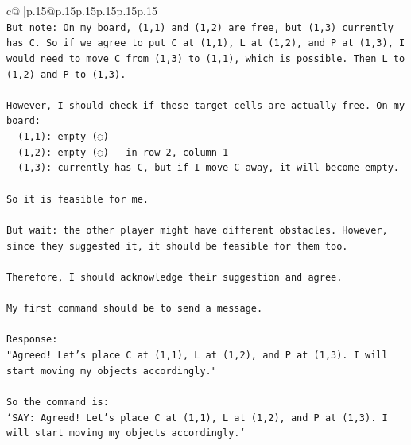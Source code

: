 \documentclass{article}
\begin{document}
{\begin{supertabular}{c@{$\;$}|p{.15\linewidth}@{}p{.15\linewidth}p{.15\linewidth}p{.15\linewidth}p{.15\linewidth}p{.15\linewidth}}
{{{\\ 
\texttt{But note: On my board, (1,1) and (1,2) are free, but (1,3) currently has C. So if we agree to put C at (1,1), L at (1,2), and P at (1,3), I would need to move C from (1,3) to (1,1), which is possible. Then L to (1,2) and P to (1,3).} \\
\\ 
\texttt{However, I should check if these target cells are actually free. On my board:} \\
\texttt{{-} (1,1): empty (◌)} \\
\texttt{{-} (1,2): empty (◌) {-} in row 2, column 1} \\
\texttt{{-} (1,3): currently has C, but if I move C away, it will become empty.} \\
\\ 
\texttt{So it is feasible for me.} \\
\\ 
\texttt{But wait: the other player might have different obstacles. However, since they suggested it, it should be feasible for them too.} \\
\\ 
\texttt{Therefore, I should acknowledge their suggestion and agree.} \\
\\ 
\texttt{My first command should be to send a message.} \\
\\ 
\texttt{Response:} \\
\texttt{"Agreed! Let's place C at (1,1), L at (1,2), and P at (1,3). I will start moving my objects accordingly."} \\
\\ 
\texttt{So the command is:} \\
\texttt{`SAY: Agreed! Let's place C at (1,1), L at (1,2), and P at (1,3). I will start moving my objects accordingly.`} \\
            }
        }
    }
     \\ \\


\end{supertabular}}
\end{document}
